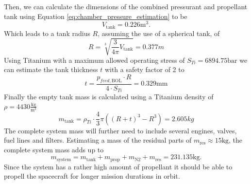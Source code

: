 \documentclass[12pt]{article}
\begin{document}
Then, we can calculate the dimensions of the combined pressurant and propellant tank using Equation \ref{eq:chamber_pressure_estimation} to be
\begin{equation*}
	V_{\text{tank}} = 0.226\text{m}^3.
\end{equation*}
Which leads to a tank radius $R$, assuming the use of a spherical tank, of
\begin{equation*}
	R = \sqrt[3]{\frac{3}{4\pi} V_{\text{tank}}} = 0.377m
\end{equation*}
Using Titanium with a maximum allowed operating stress of $S_{Ti}=6894.75\text{bar}$ we can estimate the tank thickness $t$ with a safety factor of 2 to
\begin{equation*}
	t = \frac{p_{feed,\text{BOL}}\cdot R}{4 \cdot S_{Ti}} = 0.329\text{mm}
\end{equation*}
Finally the empty tank mass is calculated using a Titanium density of $\rho=4430\frac{\text{kg}}{\text{m}^3}$
\begin{equation*}
	m_{\text{tank}} = \rho_{Ti} \cdot \frac{4}{3} \pi ((R+t)^3 - R^3) = 2.605kg
\end{equation*}
The complete system mass will further need to include several engines, valves, fuel lines and filters. Estimating a mass of the residual parts of $m_{\text{res}} \approx 15\text{kg}$, the complete system mass adds up to 
\begin{equation*}
m_{\text{system}} = m_{\text{tank}} + m_{\text{prop}} + m_{\text{N2}} + m_{\text{res}} = 231.135\text{kg}.
\end{equation*}
Since the system has a rather high amount of propellant it should be able to propell the spacecraft for longer mission durations in orbit.
\end{document}
